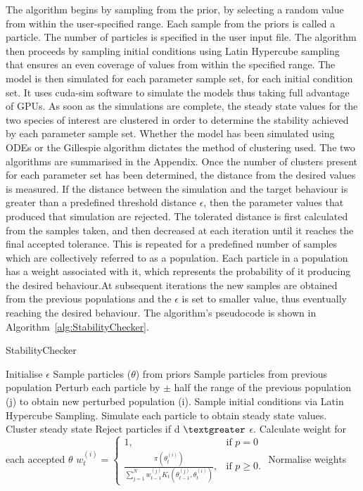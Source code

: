  The algorithm begins by sampling from the prior, by selecting a random value from within the user-specified range. Each sample from the priors is called a particle. The number of particles is specified in the user input file. The algorithm then proceeds by sampling initial conditions using Latin Hypercube sampling that ensures an even coverage of values from within the specified range. The model is then simulated for each parameter sample set, for each initial condition set.  It uses cuda-sim software \autocite{Zhou:2011hp} to simulate the models thus taking full advantage of GPUs.  As soon as the simulations are complete, the steady state values for the two species of interest are clustered in order to determine the stability achieved by each parameter sample set. Whether the model has been simulated using ODEs or the Gillespie algorithm dictates the method of clustering used. The two algorithms are summarised in the Appendix. Once the number of clusters present for each parameter set has been determined, the distance from the desired values is measured. If the distance between the simulation and the target behaviour is greater than a predefined threshold distance $\epsilon$, then the parameter values that produced that simulation are rejected. The tolerated distance is first calculated from the samples taken, and then decreased at each iteration until it reaches the final accepted tolerance. This is repeated for a predefined number of samples which are collectively referred to as a population. Each particle in a population has a weight associated with it, which represents the probability of it producing the desired behaviour.At subsequent iterations the new samples are obtained from the previous populations and the $\epsilon$ is set to smaller value, thus eventually reaching the desired behaviour. The algorithm's pseudocode is shown in Algorithm~\ref{alg:StabilityChecker}. 
\clearpage
\begin{algorithm}[ht]
	\label{alg:StabilityChecker}
  \caption{StabilityChecker}
 \begin{algorithmic}[1]
    \Statex
	\State Initialise $\epsilon$ 
		\State Sample particles ($\theta$) from priors
		\Else
			\State Sample particles from previous population
			\State Perturb each particle by $\pm$ half the range of the previous population (j) to obtain new perturbed population (i).
	\EndIf
	\State Sample initial conditions via Latin Hypercube Sampling.
    \State Simulate each particle to obtain steady state values.
    \State Cluster steady state
	\State Reject particles if d $\textgreater$ $\epsilon$.
    \State Calculate weight for each accepted $\theta$
	\State $w_{t}^{(i)} = \begin{cases} 1, & \mbox{if } p = 0 \\\frac{\pi(\theta_{t}^{(i)})}{\sum_{j=1}^N w_{t-1}^{(j)} K_{t}(\theta_{t-1}^{(j)}, \theta_{t}^{(i)})}, & \mbox{if } p \geq  0. \end{cases}$
	\State Normalise weights
	 
  \end{algorithmic}
\end{algorithm}

